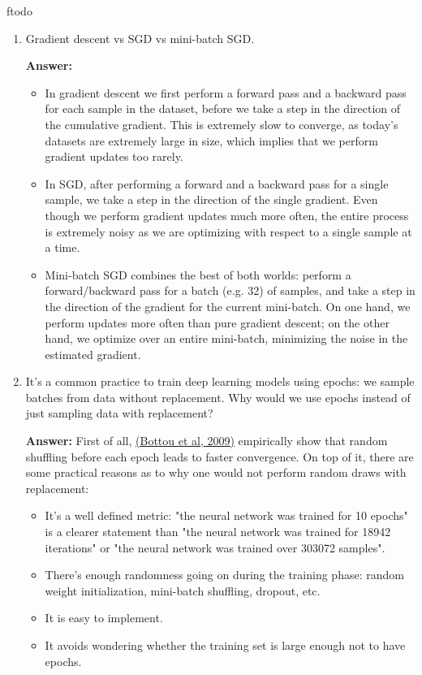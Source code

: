 ƒtodo\documentclass{article}
\newenvironment{QandA}{\begin{enumerate}[label=\arabic*.]}{\end{enumerate}}
\newenvironment{answer}{\par\normalfont \textbf{Answer:}}{}
\begin{document}
\begin{QandA}
    \item Gradient descent vs SGD vs mini-batch SGD.
    \begin{answer}
        \begin{itemize}
            \item In gradient descent we first perform a forward pass and a backward pass for each sample in the dataset, before we take a step in the direction of the cumulative gradient. This is extremely slow to converge, as today's datasets are extremely large in size, which implies that we perform gradient updates too rarely. 
            \item In SGD, after performing a forward and a backward pass for a single sample, we take a step in the direction of the single gradient. Even though we perform gradient updates much more often, the entire process is extremely noisy as we are optimizing with respect to a single sample at a time. 
            \item Mini-batch SGD combines the best of both worlds: perform a forward/backward pass for a batch (e.g. 32) of samples, and take a step in the direction of the gradient for the current mini-batch. On one hand, we perform updates more often than pure gradient descent; on the other hand, we optimize over an entire mini-batch, minimizing the noise in the estimated gradient. 
        \end{itemize}   
    \end{answer}

    \item It’s a common practice to train deep learning models using epochs: we sample batches from data without replacement. Why would we use epochs instead of just sampling data with replacement?
    \begin{answer}
        First of all, \href{https://leon.bottou.org/publications/pdf/slds-2009.pdf}{(Bottou et al, 2009)} empirically show that random shuffling before each epoch leads to faster convergence. On top of it, there are some practical reasons as to why one would not perform random draws with replacement:
        \begin{itemize}
            \item It's a well defined metric: "the neural network was trained for 10 epochs" is a clearer statement than "the neural network was trained for 18942 iterations" or "the neural network was trained over 303072 samples".
            \item There's enough randomness going on during the training phase: random weight initialization, mini-batch shuffling, dropout, etc.
            \item It is easy to implement.
            \item It avoids wondering whether the training set is large enough not to have epochs.
        \end{itemize}
        

\end{answer}
\end{QandA}
\end{document}
